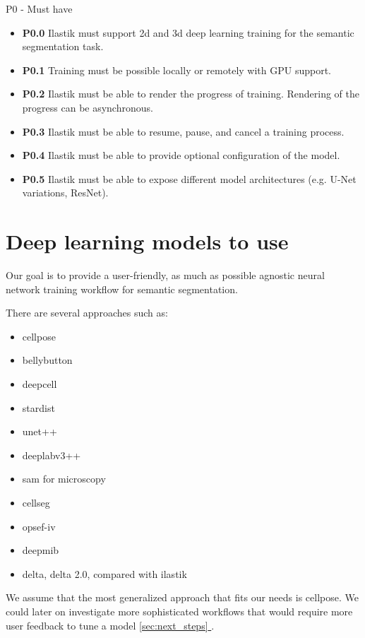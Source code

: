 \documentclass[12pt, a4paper]{article}
\newcommand*{\fullref}[1]{\hyperref[{#1}]{\ref*{#1} \nameref*{#1}}}
\begin{document}
P0 - Must have
\begin{itemize}
    \item \textbf{P0.0} Ilastik must support 2d and 3d deep learning training for the semantic segmentation task.
    \item \textbf{P0.1} Training must be possible locally or remotely with GPU support.
    \item \textbf{P0.2} Ilastik must be able to render the progress of training. Rendering of the progress can be asynchronous.
    \item \textbf{P0.3} Ilastik must be able to resume, pause, and cancel a training process.
    \item \textbf{P0.4} Ilastik must be able to provide optional configuration of the model.
    \item \textbf{P0.5} Ilastik must be able to expose different model architectures (e.g. U-Net variations, ResNet).
\end{itemize}


\section{Deep learning models to use}
\label{sec:deep_models}

Our goal is to provide a user-friendly, as much as possible agnostic neural network training workflow for semantic segmentation.

There are several approaches such as:
\begin{itemize}
    \item cellpose
    \item bellybutton
    \item deepcell
    \item stardist
    \item unet++
    \item deeplabv3++
    \item sam for microscopy
    \item cellseg
    \item opsef-iv
    \item deepmib
    \item delta, delta 2.0, compared with ilastik
\end{itemize}

We assume that the most generalized approach that fits our needs is cellpose. We could later on investigate more sophisticated workflows that would require more user feedback to tune a model \fullref{sec:next_steps}.
\end{document}
